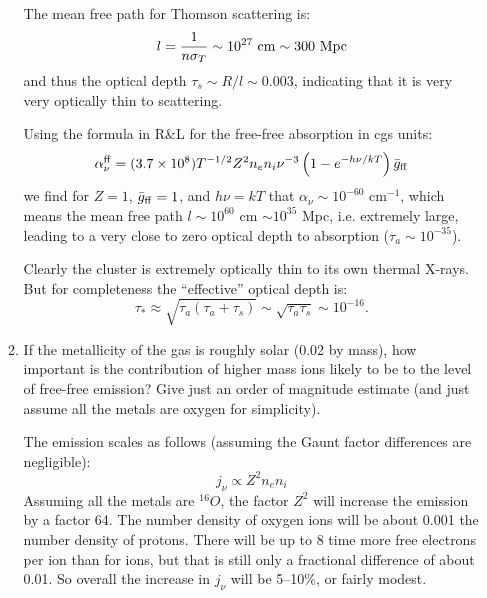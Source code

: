 \documentclass[11pt, preprint]{article}
\begin{document}
\begin{enumerate}
\begin{enumerate}
    \begin{answer}
      The mean free path for Thomson scattering is:
      \begin{equation}
        l = \frac{1}{n \sigma_T} \sim 10^{27} {\rm ~cm} \sim 300 {\rm
          ~Mpc}
      \end{equation}
      and thus the optical depth $\tau_s \sim R/l \sim 0.003$, 
      indicating that it is very very optically thin to scattering.

      Using the formula in R\&L for the free-free absorption in cgs
      units:
      \begin{equation}
        \alpha_\nu^{\rm ff} = (3.7\times 10^8) T^{-1/2} Z^2 n_e n_i
        \nu^{-3} \left(1 - e^{-h\nu/kT}\right) {\bar g}_{\rm ff}
      \end{equation}
      we find for $Z=1$, ${\bar g}_{\rm ff} = 1$, and $h\nu=kT$ that
      $\alpha_\nu \sim 10^{-60}$ cm$^{-1}$, which means the mean free
      path $l \sim 10^{60}$ cm $\sim 10^{35}$ Mpc, i.e. extremely
      large, leading to a very close to zero optical depth to
      absorption ($\tau_a \sim 10^{-35}$).

      Clearly the cluster is extremely optically thin to its own
      thermal X-rays. But for completeness the ``effective'' optical
      depth is:
      \begin{equation}
        \tau_\ast \approx \sqrt{\tau_a(\tau_a + \tau_s)} \sim
      \sqrt{\tau_a \tau_s} \sim 10^{-16}.
       \end{equation}
    \end{answer}
  \item If the metallicity of the gas is roughly solar (0.02 by mass),
    how important is the contribution of higher mass ions likely to be
    to the level of free-free emission? Give just an order of
    magnitude estimate (and just assume all the metals are oxygen for
    simplicity).

    \begin{answer}
      The emission scales as follows (assuming the Gaunt factor
      differences are negligible):
      \begin{equation}
        j_\nu \propto Z^2 n_e n_i
      \end{equation}
      Assuming all the metals are ${}^{16}O$, the factor $Z^2$ will
      increase the emission by a factor 64. The number density of
      oxygen ions will be about 0.001 the number density of
      protons. There will be up to 8 time more free electrons per
      ion than for ions, but that is still only a fractional
      difference of about 0.01. So overall the increase in $j_\nu$
      will be 5--10\%, or fairly modest.
      \end{answer}
\end{enumerate}

\end{enumerate}
\end{document}

